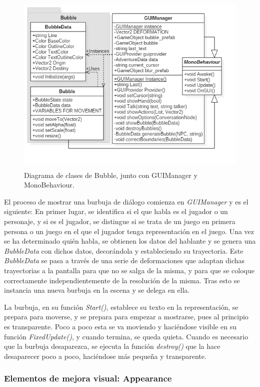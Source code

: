 \begin{figure}[h!]
	\centerline{\includegraphics[height=3.5in]{figures/it2/Bubble.png}}
	\caption[Bubble - Versión Final]{Diagrama de clases de Bubble, junto con GUIManager y MonoBehaviour.}
	\label{bubbleit2}
\end{figure}

El proceso de mostrar una burbuja de diálogo comienza en \textit{GUIManager} y es el siguiente: En primer lugar, se identifica si el que habla es el jugador o un personaje, y si es el jugador, se distingue si se trata de un juego en primera persona o un juego en el que el jugador tenga representación en el juego. Una vez se ha determinado quién habla, se obtienen los datos del hablante y se genera una \textit{BubbleData} con dichos datos, decorándola y estableciendo su trayectoria. Este \textit{BubbleData} se pasa a través de una serie de deformaciones que adaptan dichas trayectorias a la pantalla para que no se salga de la misma, y para que se coloque correctamente independientemente de la resolución de la misma. Tras esto se instancia una nueva burbuja en la escena y se delega en ella.

La burbuja, en su función \textit{Start()}, establece su texto en la representación, se prepara para moverse, y se prepara para empezar a mostrarse, pues al principio es transparente. Poco a poco esta se va moviendo y haciéndose visible en su función \textit{FixedUpdate()}, y cuando termina, se queda quieta. Cuando es necesario que la burbuja desaparezca, se ejecuta la función \textit{destroy()} que la hace desaparecer poco a poco, haciéndose más pequeña y transparente.

\subsubsection{Elementos de mejora visual: Appearance}
\label{apearanceseccionit2}

